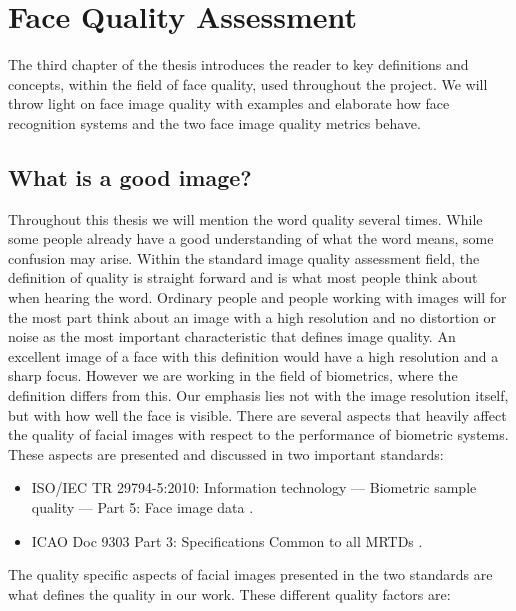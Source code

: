\chapter{Face Quality Assessment}
\label{chap:FQA}
The third chapter of the thesis introduces the reader to key definitions and concepts, within the field of face quality, used throughout the project. We will throw light on face image quality with examples and elaborate how face recognition systems and the two face image quality metrics behave.  

\section{What is a good image?}
\label{sec:setup}
Throughout this thesis we will mention the word quality several times. While some people already have a good understanding of what the word means, some confusion may arise. Within the standard image quality assessment field, the definition of quality is straight forward and is what most people think about when hearing the word. Ordinary people and people working with images will for the most part think about an image with a high resolution and no distortion or noise as the most important characteristic that defines image quality. An excellent image of a face with this definition would have a high resolution and a sharp focus. However we are working in the field of biometrics, where the definition differs from this. Our emphasis lies not with the image resolution itself, but with how well the face is visible. There are several aspects that heavily affect the quality of facial images with respect to the performance of biometric systems. These aspects are presented and discussed in two important standards: 
%
\begin{itemize}
    \item ISO/IEC TR 29794-5:2010: Information technology — Biometric sample quality — Part 5: Face image data \cite{ISO50912}.
    \item ICAO Doc 9303 Part 3: Specifications Common to all MRTDs \cite{ICAO1}. 
\end{itemize}
%
The quality specific aspects of facial images presented in the two standards are what defines the quality in our work. These different quality factors are:  

